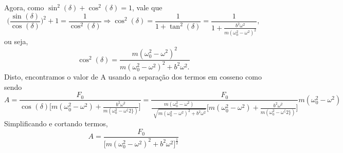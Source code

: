 \documentclass[physicsII_notes.tex]{subfiles}
\begin{document}
Agora, como \(\sin^{2}{(\delta )} + \cos^{2}{(\delta )} = 1\), vale que
\[
	\biggl(\frac{\sin^{}{(\delta )}}{\cos^{}{(\delta )}}\biggr)^{2} + 1 = \frac{1}{\cos^{2}{(\delta )}} \Rightarrow \cos^{2}{(\delta )} = \frac{1}{1+\tan^{2}{(\delta )}} = \frac{1}{1+\frac{b^{2}\omega ^{2}}{m(\omega_{0}^{2}-\omega ^{2})^{2}}},
\]
ou seja,
\[
	\cos^{2}{(\delta )} = \frac{m(\omega_{0}^{2}-\omega ^{2})^{2}}{m(\omega_{0}^{2}-\omega ^{2})^{2}+b^{2}\omega ^{2}.}
\]
Disto, encontramos o valor de A usando a separação dos termos em cosseno como sendo
\[
	A = \frac{F_{0}}{\cos^{}{(\delta )}\biggl[m(\omega_{0}^{2}-\omega ^{2})+\frac{b^{2}\omega ^{2}}{m(\omega_{0}^{2}-\omega ^\{2\})}\biggr]} = \frac{F_{0}}{\frac{m(\omega_{0}^{2}-\omega ^{2})}{\sqrt[]{m(\omega_{0}^{2}-\omega ^{2})^{2}+b^{2}\omega ^{2}}}\biggl[m(\omega_{0}^{2}-\omega ^{2})+\frac{b^{2}\omega ^{2}}{m(\omega_{0}^{2}-\omega ^\{2\})}\biggr]}m(\omega_{0}^{2}-\omega ^{2})
\]
Simplificando e cortando termos,
\[
	A = \frac{F_{0}}{\biggl[m(\omega_{0}^{2}-\omega ^{2})^{2}+b^{2}\omega ^{2}\biggr]^{\frac{1}{2}}}
\]
\end{document}
